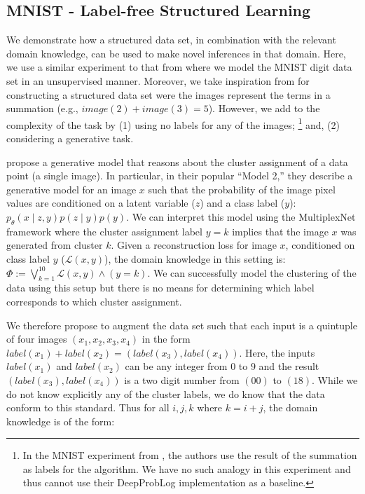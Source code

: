 \documentclass[letterpaper]{article} %
\begin{document}
\subsection{MNIST - Label-free Structured Learning}
\label{sec:mnist_experiment}
We  demonstrate how a structured data set, in combination with the relevant domain knowledge, can be used to make novel inferences in that domain.
Here, we use a similar experiment to that from \citet{kingma2014semi} where we model the MNIST digit data set in an unsupervised manner.
Moreover, we take inspiration from \citet{manhaeve2018deepproblog} for constructing a structured data set were the images represent the terms in a summation (e.g., $image(2) + image(3) = 5$).
However, we add to the complexity of the task by (1) using no labels for any of the images;%
    \footnote{In the MNIST experiment from \citet{manhaeve2018deepproblog}, the authors use the result of the summation as labels for the algorithm. We have no such analogy in this experiment and thus cannot use their DeepProbLog implementation as a baseline.}
and, (2) considering a generative task.

\citet{kingma2014semi} propose a generative model that reasons about the cluster assignment of a data point (a single image).
In particular, in their popular ``Model 2,'' they describe a generative model for an image $x$ such that the probability of the image pixel values are conditioned on a latent variable ($z$) and a class label ($y$): $p_\theta(x \mid z, y)p(z \mid y)p(y)$.
We can interpret this model using the MultiplexNet framework where the cluster assignment label $y = k$ implies that the image $x$ was generated from cluster $k$.
Given a reconstruction loss for image $x$, conditioned on class label $y$ ($\mathcal{L}(x, y)$), the domain knowledge in this setting is: $\Phi := \bigvee_{k=1}^{10} \mathcal{L}(x, y) \land (y = k)$.
We can successfully model the clustering of the data using this setup but there is no means for determining which label corresponds to which cluster assignment.

We therefore propose to augment the data set such that each input is a quintuple of four images $(x_1, x_2, x_3, x_4)$ in the form $label(x_1) + label(x_2) = (label(x_3), label(x_4))$.
Here, the inputs $label(x_1)$ and $label(x_2)$ can be any integer from $0$ to $9$ and the result $(label(x_3), label(x_4))$ is a two digit number from $(00)$ to $(18)$.
While we do not know explicitly any of the cluster labels, we do know that the data conform to this standard.
Thus for all $i,j,k$ where $k=i + j$, the domain knowledge is of the form:
\end{document}
